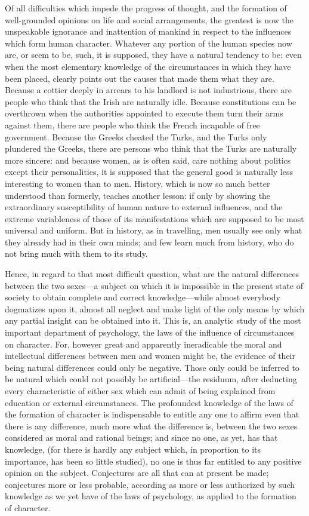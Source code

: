 \documentclass[12pt]{report}
\begin{document}
Of all difficulties which impede the progress of thought, and the formation of well-grounded opinions on life and social arrangements, the greatest is now the unspeakable ignorance and inattention of mankind in respect to the influences which form human character. Whatever any portion of the human species now are, or seem to be, such, it is supposed, they have a natural tendency to be: even when the most elementary knowledge of the circumstances in which they have been placed, clearly points out the causes that made them what they are. Because a cottier deeply in arrears to his landlord is not industrious, there are people who think that the Irish are naturally idle. Because constitutions can be overthrown when the authorities appointed to execute them turn their arms against them, there are people who think the French incapable of free government. Because the Greeks cheated the Turks, and the Turks only plundered the Greeks, there are persons who think that the Turks are naturally more sincere: and because women, as is often said, care nothing about politics except their personalities, it is supposed that the general good is naturally less interesting to women than to men. History, which is now so much better understood than formerly, teaches another lesson: if only by showing the extraordinary susceptibility of human nature to external influences, and the extreme variableness of those of its manifestations which are supposed to be most universal and uniform. But in history, as in travelling, men usually see only what they already had in their own minds; and few learn much from history, who do not bring much with them to its study.

Hence, in regard to that most difficult question, what are the natural differences between the two sexes—a subject on which it is impossible in the present state of society to obtain complete and correct knowledge—while almost everybody dogmatizes upon it, almost all neglect and make light of the only means by which any partial insight can be obtained into it. This is, an analytic study of the most important department of psychology, the laws of the influence of circumstances on character. For, however great and apparently ineradicable the moral and intellectual differences between men and women might be, the evidence of their being natural differences could only be negative. Those only could be inferred to be natural which could not possibly be artificial—the residuum, after deducting every characteristic of either sex which can admit of being explained from education or external circumstances. The profoundest knowledge of the laws of the formation of character is indispensable to entitle any one to affirm even that there is any difference, much more what the difference is, between the two sexes considered as moral and rational beings; and since no one, as yet, has that knowledge, (for there is hardly any subject which, in proportion to its importance, has been so little studied), no one is thus far entitled to any positive opinion on the subject. Conjectures are all that can at present be made; conjectures more or less probable, according as more or less authorized by such knowledge as we yet have of the laws of psychology, as applied to the formation of character.
\end{document}
